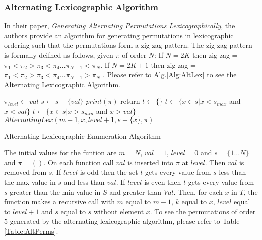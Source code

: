 \subsubsection{Alternating Lexicographic Algorithm}
In their paper, \emph{Generating Alternating Permutations Lexicographically}, the authors provide an algorithm 
for generating permutations in lexicographic ordering such that the permutations form a zig-zag pattern. 
The zig-zag pattern is formally deifned as follows, given $\pi$ of order $N$:  If $N = 2K$ then 
zig-zag = $\pi_{1} < \pi_{2} > \pi_{3} < \pi_{4} \dots \pi_{N-1} < \pi_{N}$. 
If $N= 2K+1$ then zig-zag = $\pi_{1} < \pi_{2} > \pi_{3} < \pi_{4} \dots \pi_{N-1} > \pi_{N}$ \cite{A19}.
Please refer to Alg.\ref{Alg:AltLex} to see the Alternating Lexicographic Algorithm.


\begin{algorithm}
    \begin{algorithmic}[1]
            \State $\pi_{level} \gets val$
            \State $s \gets s-\{val\}$
                \State $print(\pi)$
                \State return
            \EndIf
            \State $t \gets \{\}$
                \State $t \gets \{x \in s | x < s_{max}$ and $x < val\}$
            \Else 
                \State $t \gets \{x \in s | x > s_{min}$ and $x > val\}$
            \EndIf
                \State $AlternatingLex(m-1, x, level+1, s - \{x\}, \pi)$
            \EndFor
        \EndFunction
        
    \end{algorithmic}
    \caption{Alternating Lexicographic Enumeration Algorithm}
    \label{Alg:AltLex}
\end{algorithm}

The initial values for the funtion are $m=N$, $val=1$, $level=0$ and $s = \{1 \dots N\}$ and $\pi=()$.
On each function call $val$ is inserted into $\pi$ at $level$. Then $val$ is removed from $s$.
If $level$ is odd then the set $t$ gets every value from $s$ less than the max value in $s$ and 
less than $val$. If  $level$ is even then $t$ gets every value from $s$ greater than  the min value 
in $S$ and greater than $Val$. Then, for each $x$ in $T$, the function makes a recursive call 
with $m$ equal to $m-1$, $k$ equal to $x$, $level$ equal to $level+1$ and $s$ equal to $s$ without 
element $x$. To see the permutations of order $5$ generated by the alternating lexicographic algorithm, 
please refer to Table \ref{Table:AltPerms}.

